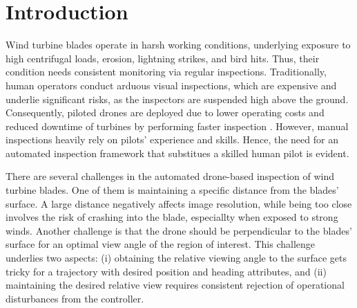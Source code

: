 
\section{Introduction}




Wind turbine blades operate in harsh working conditions, underlying exposure to high centrifugal loads, erosion, lightning strikes, and bird hits. Thus, their condition needs consistent monitoring via regular inspections. Traditionally, human operators conduct arduous visual inspections, which are expensive and underlie significant risks, as the inspectors are suspended high above the ground. Consequently, piloted drones are deployed due to lower operating costs and reduced downtime of turbines by performing faster inspection \cite{NLR}. However, manual inspections heavily rely on pilots' experience and skills. Hence, the need for an automated inspection framework that substitues a skilled human pilot is evident.

There are several challenges in the automated drone-based inspection of wind turbine blades. One of them is maintaining a specific distance from the blades’ surface. A large distance negatively affects image resolution, while being too close involves the risk of crashing into the blade, especiallty when exposed to strong winds.
Another challenge is that the drone should be perpendicular to the blades’ surface for an optimal view angle of the region of interest. This challenge underlies two aspects: (i) obtaining the relative viewing angle to the surface gets tricky for a trajectory with desired position and heading attributes, and (ii) maintaining the desired relative view requires consistent rejection of operational disturbances from the controller.





